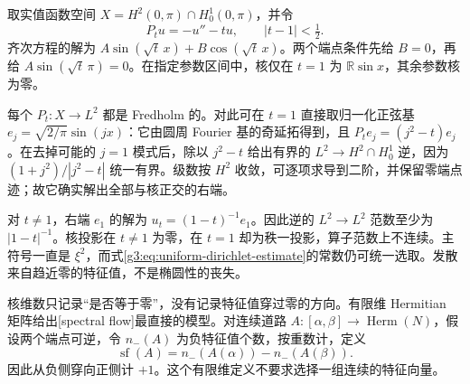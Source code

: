\begin{example}\label{g3:exm:dirichlet-resonance-parameter}
	取实值函数空间 \(X=H^2(0,\pi)\cap H^1_0(0,\pi)\)，并令
	\[
		P_tu=-u''-tu,\qquad |t-1|<\tfrac12.
	\]
	齐次方程的解为 \(A\sin(\sqrt t\,x)+B\cos(\sqrt t\,x)\)。两个端点条件先给 \(B=0\)，再给 \(A\sin(\sqrt t\,\pi)=0\)。在指定参数区间中，核仅在 \(t=1\) 为 \(\mathbb R\sin x\)，其余参数核为零。

	每个 \(P_t:X\to L^2\) 都是 Fredholm 的。对此可在 \(t=1\) 直接取归一化正弦基 \(e_j=\sqrt{2/\pi}\sin(jx)\)：它由圆周 Fourier 基的奇延拓得到，且 \(P_te_j=(j^2-t)e_j\)。在去掉可能的 \(j=1\) 模式后，除以 \(j^2-t\) 给出有界的 \(L^2\to H^2\cap H^1_0\) 逆，因为 \((1+j^2)/|j^2-t|\) 统一有界。级数按 \(H^2\) 收敛，可逐项求导到二阶，并保留零端点迹；故它确实解出全部与核正交的右端。

	对 \(t\ne1\)，右端 \(e_1\) 的解为 \(u_t=(1-t)^{-1}e_1\)。因此逆的 \(L^2\to L^2\) 范数至少为 \(|1-t|^{-1}\)。核投影在 \(t\ne1\) 为零，在 \(t=1\) 却为秩一投影，算子范数上不连续。主符号一直是 \(\xi^2\)，而式\eqref{g3:eq:uniform-dirichlet-estimate}的常数仍可统一选取。发散来自趋近零的特征值，不是椭圆性的丧失。
\end{example}

核维数只记录“是否等于零”，没有记录特征值穿过零的方向。有限维 Hermitian 矩阵给出[spectral flow]最直接的模型。对连续道路 \(A:[\alpha,\beta]\to\operatorname{Herm}(N)\)，假设两个端点可逆，令 \(n_-(A)\) 为负特征值个数，按重数计，定义
\begin{equation}\label{g3:eq:finite-spectral-flow}
	\operatorname{sf}(A)=n_-(A(\alpha))-n_-(A(\beta)).
\end{equation}
因此从负侧穿向正侧计 \(+1\)。这个有限维定义不要求选择一组连续的特征向量。

